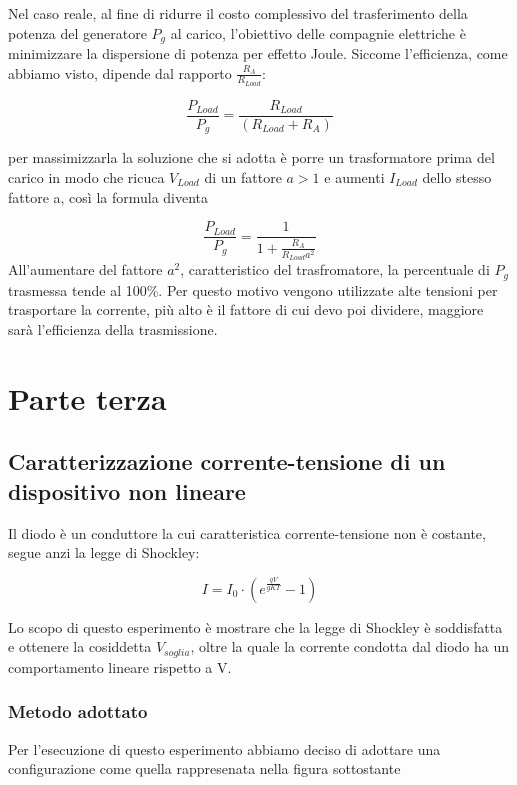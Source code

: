 \documentclass[a4paper]{article}
\theoremstyle{definition}
\begin{document}
\noindent Nel caso reale, al fine di ridurre il costo complessivo del trasferimento della potenza del generatore \(P_{g}\) al carico, l'obiettivo delle compagnie elettriche è minimizzare la dispersione di potenza per effetto Joule. Siccome l'efficienza, come abbiamo visto, dipende dal rapporto \(\frac{R_{A}}{R_{Load}}\):

\[\frac{P_{Load}}{P_{g}} = \frac{R_{Load}}{(R_{Load} + R_{A})}\]

\noindent per massimizzarla la soluzione che si adotta è porre un trasformatore prima del carico in modo che ricuca \(V_{Load}\) di un fattore \(a > 1\) e aumenti \(I_{Load}\) dello stesso fattore a, così la formula diventa 

\[\frac{P_{Load}}{P_{g}} = \frac{1}{1 + \frac{R_{A}}{R_{Load}a^{2}}}\]
All'aumentare del fattore \(a^{2}\), caratteristico del trasfromatore, la percentuale di \(P_{g}\) trasmessa tende al 100\%.
Per questo motivo vengono utilizzate  alte tensioni per trasportare la corrente, più alto è il fattore di cui devo poi dividere, maggiore sarà l'efficienza della trasmissione.
\pagebreak


\section{Parte terza} %
\subsection{Caratterizzazione corrente-tensione di un dispositivo non lineare}
Il diodo è un conduttore la cui caratteristica corrente-tensione non è costante, segue anzi la legge di Shockley:

     \[I = I_{0} \cdot \left(e^{\frac{qV}{gKT}}-1\right) \]

\noindent Lo scopo di questo esperimento è mostrare che la legge di Shockley è soddisfatta e ottenere la cosiddetta \(V_{soglia}\), oltre la quale la corrente condotta dal diodo ha un comportamento lineare rispetto a V.


\subsubsection*{Metodo adottato}
Per l'esecuzione di questo esperimento abbiamo deciso di adottare una configurazione come quella rappresenata nella figura sottostante


\begin{figure}[!ht]

    \caption{}
  \label{fig:diodo}
\end{figure}
\end{document}
